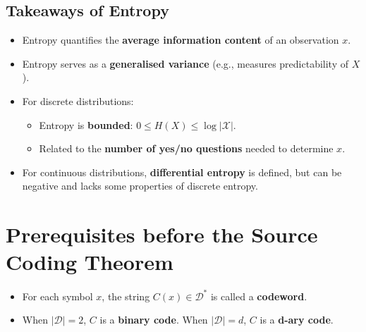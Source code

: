 \label{def:gaussian_entropy}

\subsection{Takeaways of Entropy}
\begin{itemize}
    \item Entropy quantifies the \textbf{average information content} of an observation \(x\).
    \item Entropy serves as a \textbf{generalised variance} (e.g., measures predictability of \(X\)).
    \item For discrete distributions:
          \begin{itemize}
              \item Entropy is \textbf{bounded}: \(0 \leq H(X) \leq \log |\mathcal{X}|\).
              \item Related to the \textbf{number of yes/no questions} needed to determine \(x\).
          \end{itemize}
    \item For continuous distributions, \textbf{differential entropy} is defined, but can be negative and lacks some properties of discrete entropy.
\end{itemize}

\section{Prerequisites before the Source Coding Theorem}


\begin{itemize}
    \item For each symbol \( x \), the string \( C(x) \in \mathcal{D}^* \) is called a \textbf{codeword}.
    \item When \( |\mathcal{D}| = 2 \), \( C \) is a \textbf{binary code}. When \( |\mathcal{D}| = d \), \( C \) is a \textbf{d-ary code}.
\end{itemize}

